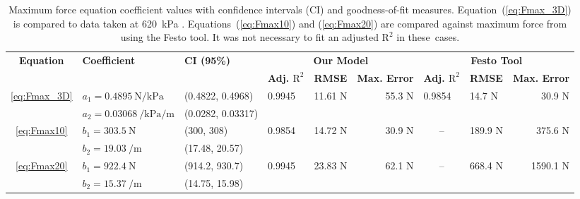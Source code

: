 \begin{table}[H]
\caption{Maximum force equation coefficient values with confidence intervals (CI) and goodness-of-fit measures. Equation~(\ref{eq:Fmax_3D}) is compared to data taken at \qty{620}{\kPa} . Equations~(\ref{eq:Fmax10}) and (\ref{eq:Fmax20}) are compared against maximum force from using the Festo tool. It was not necessary to fit an adjusted $\text{R}^2$ in \mbox{these cases.}} 
\label{tab:Fmax}
\tiny
\begin{adjustwidth}{0cm}{0cm}
\begin{tabularx}{\textwidth}{cllllrclr}
\toprule
\multirow{2}{*}{\textbf{Equation}} &
  \multirow{2.1}{*}{\textbf{Coefficient}} &
  \multirow{2.2}{*}{\textbf{CI (95\%)}} &
  \multicolumn{3}{c}{\textbf{Our Model}} &
  \multicolumn{3}{c}{\textbf{Festo Tool}} \\  
 &
   &
   &
  \multicolumn{1}{l}{\textbf{Adj. $\text{R}^2$}} &
  \multicolumn{1}{l}{\textbf{RMSE}} &
  \textbf{Max. Error} &
  \multicolumn{1}{l}{\textbf{Adj. $\text{R}^2$}} &
  \multicolumn{1}{l}{\textbf{RMSE}} &
  \textbf{Max. Error} \\ \midrule 
\multirow{2}{*}{\eqref{eq:Fmax_3D}} &
  $a_1 =   \qty{0.4895}{\N\per\kPa}$ &
  (0.4822, 0.4968) &
  \multicolumn{1}{l}{\multirow{2}{*}{0.9945}} &
  \multicolumn{1}{l}{\multirow{2}{*}{11.61 N}} &
  \multirow{2}{*}{55.3 N} &
  \multicolumn{1}{l}{\multirow{2}{*}{0.9854}} &
  \multicolumn{1}{l}{\multirow{2}{*}{14.7 N}} &
  \multirow{2}{*}{30.9 N} \\ 
 &
  $a_2 =   \qty{0.03068}{\per\kPa\per\m}$ &
  (0.0282, 0.03317) &
  \multicolumn{1}{l}{} &
  \multicolumn{1}{l}{} &
   &
  \multicolumn{1}{l}{} &
  \multicolumn{1}{l}{} &
   \\ \midrule
\multirow{2}{*}{\eqref{eq:Fmax10}} &
  $b_1   =\qty{303.5}{\N}$ &
  (300, 308) &
  \multicolumn{1}{l}{\multirow{2}{*}{0.9854}} &
  \multicolumn{1}{l}{\multirow{2}{*}{14.72 N}} &
  \multirow{2}{*}{30.9 N} &
  \multicolumn{1}{c}{\multirow{2}{*}{--}} &
  \multicolumn{1}{l}{\multirow{2}{*}{189.9 N}} &
  \multirow{2}{*}{375.6 N} \\ 
 &
  $b_2 =   \qty{19.03}{\per\m}$ &
  (17.48, 20.57) &
  \multicolumn{1}{l}{} &
  \multicolumn{1}{l}{} &
   &
  \multicolumn{1}{l}{} &
  \multicolumn{1}{l}{} &
   \\ \midrule
\multirow{2}{*}{\eqref{eq:Fmax20}} &
  $b_1 =   \qty{922.4}{\N}$ &
  (914.2, 930.7) &
  \multicolumn{1}{l}{\multirow{2}{*}{0.9945}} &
  \multicolumn{1}{l}{\multirow{2}{*}{23.83 N}} &
  \multirow{2}{*}{62.1 N} &
  \multicolumn{1}{c}{\multirow{2}{*}{--}} &
  \multicolumn{1}{l}{\multirow{2}{*}{668.4 N}} &
  \multirow{2}{*}{1590.1 N} \\ 
 &
  $b_2=\qty{15.37}{\per\m}$ &
  (14.75, 15.98) &
  \multicolumn{1}{l}{} &
  \multicolumn{1}{l}{} &
   &
  \multicolumn{1}{l}{} &
  \multicolumn{1}{l}{} &
   \\ \bottomrule
\end{tabularx}
\end{adjustwidth}
\end{table}



